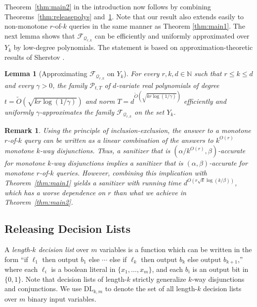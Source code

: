 \documentclass[11pt]{article}
\newcommand\N{\mathbb{N}}
\newcommand\cF{\mathcal{F}}
\newcommand\cP{\mathcal{P}}
\newcommand\cQ{\mathcal{Q}}
\newtheorem{lemma}[theorem]{Lemma}
\newtheorem{remark}[theorem]{Remark}
\theoremstyle{definition}
\begin{document}
Theorem~\ref{thm:main2} in the introduction now follows by combining Theorems~\ref{thm:releasepolys} and~\ref{thm:approx2}. Note that our result also extends easily
to non-monotone $r$-of-$k$ queries in the same manner as Theorem \ref{thm:main1}.  
\else
The next lemma shows that $\cF_{\cQ_{r,k}}$ can be efficiently and uniformly approximated over $Y_k$ by low-degree polynomials.  The statement is based on approximation-theoretic results of Sherstov \cite[Lemma 3.11]{Sherstov09}.
\begin{lemma}[Approximating $\cF_{\cQ_{r, k}}$ on $Y_k$] \label{thm:approx2}
For every $r,k,d \in \N$ such that $r \leq k \leq d$ and every $\gamma > 0$, the family $\cP_{t,T}$ of $d$-variate real polynomials of degree $t = \tilde{O}(\sqrt{kr \log(1/\gamma)})$ and norm $T = d^{\tilde{O}(\sqrt{kr \log(1/\gamma)})}$ efficiently and uniformly $\gamma$-approximates the family $\cF_{\cQ_{r, k}}$ on the set $Y_k$.
\end{lemma}
\fi

\begin{remark}
Using the principle of inclusion-exclusion, the answer to a monotone $r$-of-$k$ query can be written as a linear combination of the answers to $k^{O(r)}$ monotone $k$-way disjunctions. Thus, a sanitizer that is $(\alpha/k^{O(r)}, \beta)$-accurate for monotone $k$-way disjunctions implies a sanitizer that is $(\alpha, \beta)$-accurate for monotone $r$-of-$k$ queries. However, combining this implication with Theorem~\ref{thm:main1} yields a sanitizer with running time $d^{O(r \sqrt{k} \log(k/\beta))}$, which has a worse dependence on $r$ than what we achieve in Theorem~\ref{thm:main2}.
\end{remark}

\subsection{Releasing Decision Lists} \label{sec:dls}

A \emph{length-$k$ decision list} over $m$ variables is a function which can be written in the form
``if $\ell_1$ then output $b_1$ else $\cdots$ else if $\ell_k$
then output $b_k$ else output $b_{k+1}$,'' where each
$\ell_i$ is a boolean literal in $\{x_1, \dots, x_m\}$, and each $b_i$ is an output
bit in $\{0,1\}.$ Note that decision lists of length-$k$ strictly generalize $k$-way disjunctions and conjunctions.  We use $\mathrm{DL}_{k,m}$ to denote the set of all length-$k$ decision lists over $m$ binary input variables.
\end{document}
